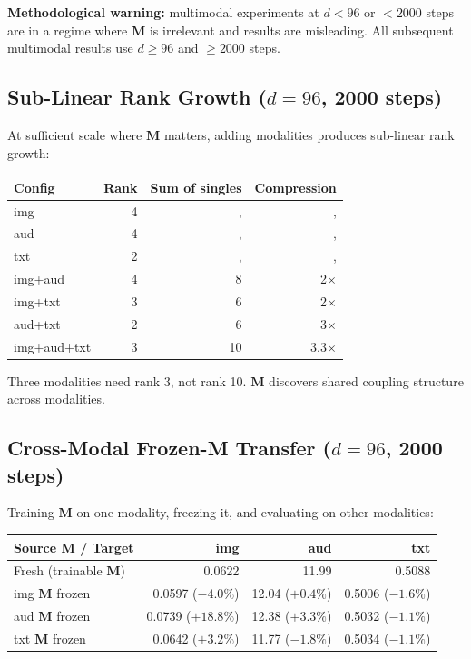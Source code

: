 \documentclass[11pt, a4paper]{article}
\newcommand{\M}{\mathbf{M}}
\theoremstyle{remark}
\begin{document}
\textbf{Methodological warning:} multimodal experiments at $d < 96$ or $< 2000$ steps are in a regime where $\M$ is irrelevant and results are misleading.
All subsequent multimodal results use $d \geq 96$ and $\geq 2000$ steps.

\subsection{Sub-Linear Rank Growth ($d{=}96$, 2000 steps)}

At sufficient scale where $\M$ matters, adding modalities produces sub-linear rank growth:

\begin{center}\small
\begin{tabular}{@{}lrrr@{}}
\toprule
\textbf{Config} & \textbf{Rank} & \textbf{Sum of singles} & \textbf{Compression} \\
\midrule
img & 4 & ,  & ,  \\
aud & 4 & ,  & ,  \\
txt & 2 & ,  & ,  \\
\midrule
img+aud & 4 & 8 & 2$\times$ \\
img+txt & 3 & 6 & 2$\times$ \\
aud+txt & 2 & 6 & 3$\times$ \\
img+aud+txt & 3 & 10 & 3.3$\times$ \\
\bottomrule
\end{tabular}
\end{center}

Three modalities need rank 3, not rank 10.
$\M$ discovers shared coupling structure across modalities.

\subsection{Cross-Modal Frozen-M Transfer ($d{=}96$, 2000 steps)}

Training $\M$ on one modality, freezing it, and evaluating on other modalities:

\begin{center}\small
\begin{tabular}{@{}lrrr@{}}
\toprule
\textbf{Source $\M$ / Target} & \textbf{img} & \textbf{aud} & \textbf{txt} \\
\midrule
Fresh (trainable $\M$) & 0.0622 & 11.99 & 0.5088 \\
img $\M$ frozen & 0.0597 ($-4.0\%$) & 12.04 ($+0.4\%$) & 0.5006 ($-1.6\%$) \\
aud $\M$ frozen & 0.0739 ($+18.8\%$) & 12.38 ($+3.3\%$) & 0.5032 ($-1.1\%$) \\
txt $\M$ frozen & 0.0642 ($+3.2\%$) & 11.77 ($-1.8\%$) & 0.5034 ($-1.1\%$) \\
\bottomrule
\end{tabular}
\end{center}
\end{document}
